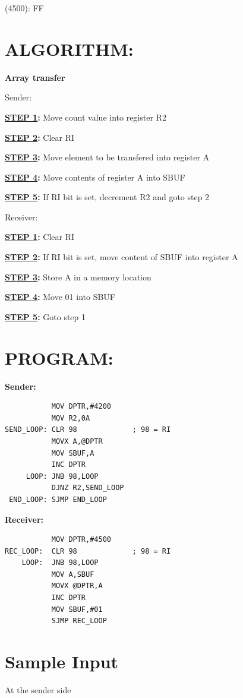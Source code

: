 \documentclass[a4paper,28pt,twoside,openright]{report}
\begin{document}
(4500): FF

\section*{ALGORITHM:}
\textbf{Array transfer}

\large{Sender:}

\textbf{\underline{STEP 1}:} Move count value into register R2

\textbf{\underline{STEP 2}:} Clear RI

\textbf{\underline{STEP 3}:} Move element to be transfered into register A

\textbf{\underline{STEP 4}:} Move contents of register A into SBUF

\textbf{\underline{STEP 5}:} If RI bit is set, decrement R2 and goto step 2

\vspace*{10pt}
\large{Receiver:}

\textbf{\underline{STEP 1}:} Clear RI 

\textbf{\underline{STEP 2}:} If RI bit is set, move content of SBUF into register A

\textbf{\underline{STEP 3}:} Store A in a memory location

\textbf{\underline{STEP 4}:} Move 01 into SBUF

\textbf{\underline{STEP 5}:} Goto step 1

\section*{PROGRAM:}
\textbf{Sender:}
\begin{lstlisting}
           MOV DPTR,#4200
           MOV R2,0A
SEND_LOOP: CLR 98             ; 98 = RI
           MOVX A,@DPTR
           MOV SBUF,A
           INC DPTR
     LOOP: JNB 98,LOOP
           DJNZ R2,SEND_LOOP
 END_LOOP: SJMP END_LOOP
\end{lstlisting}

\vspace{20pt}

\textbf{Receiver:}
\begin{lstlisting}
           MOV DPTR,#4500
REC_LOOP:  CLR 98             ; 98 = RI
    LOOP:  JNB 98,LOOP
           MOV A,SBUF
           MOVX @DPTR,A
           INC DPTR
           MOV SBUF,#01
           SJMP REC_LOOP
\end{lstlisting}


\section*{Sample Input}
At the sender side
\end{document}
